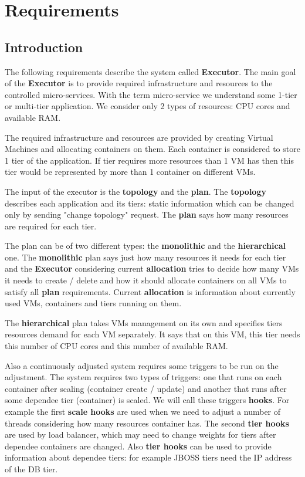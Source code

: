 \chapter{Requirements}
\label{requirements}
\section{Introduction}

The following requirements describe the system called \textbf{Executor}. The main goal of the \textbf{Executor} is to provide required infrastructure and resources to the controlled micro-services.
With the term micro-service we understand some 1-tier or multi-tier application. We consider only 2 types of resources: CPU cores and available RAM. 

The required infrastructure and resources are provided by creating Virtual Machines and allocating containers on them. Each container is considered to store 1 tier of the application. If tier requires more resources than 1 VM has then this tier would be represented by more than 1 container on different VMs.

The input of the executor is the \textbf{topology} and the \textbf{plan}. 
The \textbf{topology} describes each application and its tiers:
static information which can be changed only by sending "change topology" request. The \textbf{plan} says how many resources are required for each tier. 

The plan can be of two different types: the \textbf{monolithic} and the \textbf{hierarchical} one. The \textbf{monolithic} plan says just how many resources it needs for each tier and the \textbf{Executor} considering current \textbf{allocation} tries to decide how many VMs it needs to create / delete and how it should allocate containers on all VMs to satisfy all \textbf{plan} requirements. Current \textbf{allocation} is information about currently used VMs, containers and tiers running on them.

The \textbf{hierarchical} plan takes VMs management on its own and specifies tiers resources demand for each VM separately. It says that on this VM, this tier needs this number of CPU cores and this number of available RAM.

Also a continuously adjusted system requires some triggers to be run on the adjustment. The system requires two types of triggers: one that runs on each container after scaling (container create / update) and another that runs after some dependee tier (container) is scaled. We will call these triggers \textbf{hooks}. For example the first \textbf{scale hooks} are used when we need to adjust a number of threads considering how many resources container has. The second \textbf{tier hooks} are used by load balancer, which may need to change weights for tiers after dependee containers are changed. Also \textbf{tier hooks} can be used to provide information about dependee tiers: for example JBOSS tiers need the IP address of the DB tier.

